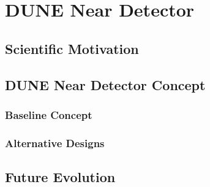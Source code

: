 \chapter{DUNE Near Detector}
\label{ch:exec-summ-nd}


\section{Scientific Motivation }
\label{sec:exec-summ-nd-motiv}

\section{DUNE Near Detector Concept}
\label{sec:exec-summ-nd-concept}

\subsection{Baseline Concept}
\label{sec:exec-summ-nd-base}

\subsection{Alternative Designs}
\label{sec:exec-summ-nd-alt}

\section{Future Evolution}
\label{sec:exec-summ-nd-evol}

